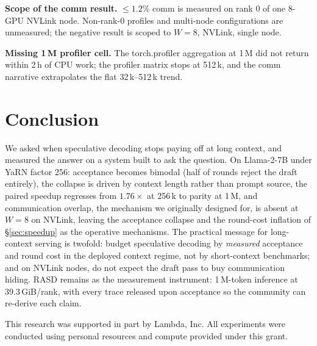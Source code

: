 \documentclass{article}
\begin{document}
\textbf{Scope of the comm result.} $\leq 1.2\%$ comm is measured
on rank 0 of one 8-GPU NVLink node. Non-rank-0 profiles and
multi-node configurations are unmeasured; the negative result is
scoped to $W=8$, NVLink, single node.

\textbf{Missing 1\,M profiler cell.} The torch.profiler
aggregation at 1\,M did not return within 2\,h of CPU work; the
profiler matrix stops at 512\,k, and the comm narrative
extrapolates the flat 32\,k--512\,k trend.

\section{Conclusion}
\label{sec:conclusion}

We asked when speculative decoding stops paying off at long
context, and measured the answer on a system built to ask the
question. On Llama-2-7B under YaRN factor 256: acceptance becomes
bimodal (half of rounds reject the draft entirely), the collapse
is driven by context length rather than prompt source, the paired
speedup regresses from $1.76\times$ at 256\,k to parity at 1\,M,
and communication overlap, the mechanism we originally designed
for, is absent at $W=8$ on NVLink, leaving the acceptance collapse
and the round-cost inflation of \S\ref{sec:speedup} as the
operative mechanisms. The practical message for
long-context serving is twofold: budget speculative decoding by
\emph{measured} acceptance and round cost in the deployed context
regime, not by short-context benchmarks; and on NVLink nodes, do
not expect the draft pass to buy communication hiding. RASD remains as the
measurement instrument: 1\,M-token inference at 39.3\,GiB/rank,
with every trace released upon acceptance so the community can
re-derive each claim.

\begin{ack}
This research was supported in part by Lambda, Inc. All experiments were conducted using personal resources and compute provided under this grant.
\end{ack}



\end{document}
